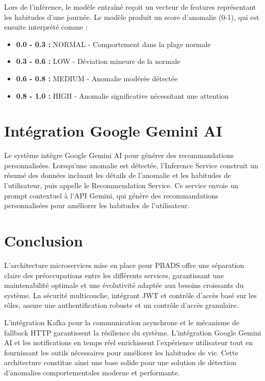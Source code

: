 Lors de l'inférence, le modèle entraîné reçoit un vecteur de features représentant les habitudes d'une journée. Le modèle produit un score d'anomalie (0-1), qui est ensuite interprété comme :
\begin{itemize}
    \item \textbf{0.0 - 0.3 :} NORMAL - Comportement dans la plage normale
    \item \textbf{0.3 - 0.6 :} LOW - Déviation mineure de la normale
    \item \textbf{0.6 - 0.8 :} MEDIUM - Anomalie modérée détectée
    \item \textbf{0.8 - 1.0 :} HIGH - Anomalie significative nécessitant une attention
\end{itemize}

\section{Intégration Google Gemini AI}

Le système intègre Google Gemini AI pour générer des recommandations personnalisées. Lorsqu'une anomalie est détectée, l'Inference Service construit un résumé des données incluant les détails de l'anomalie et les habitudes de l'utilisateur, puis appelle le Recommendation Service. Ce service envoie un prompt contextuel à l'API Gemini, qui génère des recommandations personnalisées pour améliorer les habitudes de l'utilisateur.

\section{Conclusion}

L'architecture microservices mise en place pour PBADS offre une séparation claire des préoccupations entre les différents services, garantissant une maintenabilité optimale et une évolutivité adaptée aux besoins croissants du système. La sécurité multicouche, intégrant JWT et contrôle d'accès basé sur les rôles, assure une authentification robuste et un contrôle d'accès granulaire.

L'intégration Kafka pour la communication asynchrone et le mécanisme de fallback HTTP garantissent la résilience du système. L'intégration Google Gemini AI et les notifications en temps réel enrichissent l'expérience utilisateur tout en fournissant les outils nécessaires pour améliorer les habitudes de vie. Cette architecture constitue ainsi une base solide pour une solution de détection d'anomalies comportementales moderne et performante.
